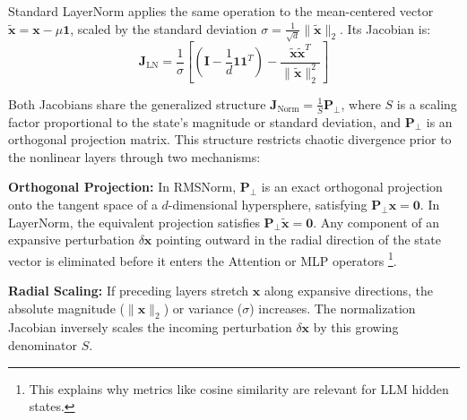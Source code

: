 \documentclass[a4paper,12pt]{article}
\begin{document}
    Standard LayerNorm applies the same operation to the mean-centered vector $\mathbf{\tilde{x}} = \mathbf{x} - \mu \mathbf{1}$, scaled by the standard deviation $\sigma = \frac{1}{\sqrt{d}} \|\mathbf{\tilde{x}}\|_2$. Its Jacobian is:
    \begin{equation}
        \mathbf{J}_{\text{LN}} = \frac{1}{\sigma} \left[ \left( \mathbf{I} - \frac{1}{d}\mathbf{1}\mathbf{1}^T \right) - \frac{\mathbf{\tilde{x}} \mathbf{\tilde{x}}^T}{\|\mathbf{\tilde{x}}\|_2^2} \right]
    \end{equation}

    Both Jacobians share the generalized structure $\mathbf{J}_{\text{Norm}} = \frac{1}{S} \mathbf{P}_{\perp}$, where $S$ is a scaling factor proportional to the state's magnitude or standard deviation, and $\mathbf{P}_{\perp}$ is an orthogonal projection matrix. This structure restricts chaotic divergence prior to the nonlinear layers through two mechanisms:

    \textbf{Orthogonal Projection:} 
    In RMSNorm, $\mathbf{P}_{\perp}$ is an exact orthogonal projection onto the tangent space of a $d$-dimensional hypersphere, satisfying $\mathbf{P}_{\perp} \mathbf{x} = \mathbf{0}$. In LayerNorm, the equivalent projection satisfies $\mathbf{P}_{\perp} \mathbf{\tilde{x}} = \mathbf{0}$. Any component of an expansive perturbation $\delta \mathbf{x}$ pointing outward in the radial direction of the state vector is eliminated before it enters the Attention or MLP operators \footnote{This explains why metrics like cosine similarity are relevant for LLM hidden states.}.

    \textbf{Radial Scaling:} 
    If preceding layers stretch $\mathbf{x}$ along expansive directions, the absolute magnitude ($\|\mathbf{x}\|_2$) or variance ($\sigma$) increases. The normalization Jacobian inversely scales the incoming perturbation $\delta \mathbf{x}$ by this growing denominator $S$. 


\end{document}
